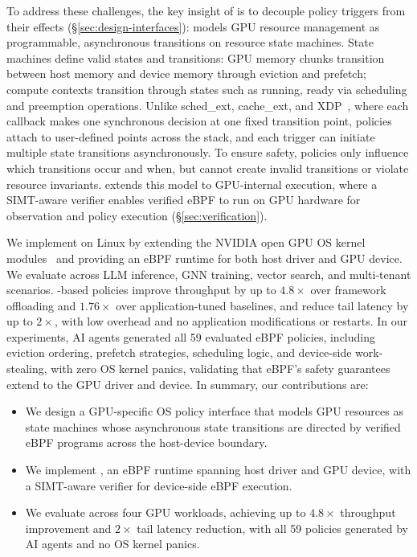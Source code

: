 To address these challenges, the key insight of \sys{} is to decouple policy triggers from their effects (\S\ref{sec:design-interfaces}): \sys{} models GPU resource management as programmable, asynchronous transitions on resource state machines. State machines define valid states and transitions: GPU memory chunks transition between host memory and device memory through eviction and prefetch; compute contexts transition through states such as running, ready via scheduling and preemption operations.
Unlike sched\_ext\cite{schedext-docs}, cache\_ext\cite{zussman2025cache_ext}, and XDP~\cite{bachl2021flow}, where each callback makes one synchronous decision at one fixed transition point, \sys{} policies attach to user-defined points across the stack, and each trigger can initiate multiple state transitions asynchronously. To ensure safety, policies only influence which transitions occur and when, but cannot create invalid transitions or violate resource invariants. \sys{} extends this model to GPU-internal execution, where a SIMT-aware verifier enables verified eBPF to run on GPU hardware for observation and policy execution (\S\ref{sec:verification}).

We implement \sys{} on Linux by extending the NVIDIA open GPU OS kernel modules~\cite{nvidia-open-gpu} and providing an eBPF runtime for both host driver and GPU device. We evaluate \sys{} across LLM inference, GNN training, vector search, and multi-tenant scenarios. \sys-based policies improve throughput by up to $4.8\times$ over framework offloading and $1.76\times$ over application-tuned baselines, and reduce tail latency by up to $2\times$, with low overhead and no application modifications or restarts.
In our experiments, AI agents generated all 59 evaluated eBPF policies, including eviction ordering, prefetch strategies, scheduling logic, and device-side work-stealing, with zero OS kernel panics, validating that eBPF's safety guarantees extend to the GPU driver and device. In summary, our contributions are:

\begin{itemize}[leftmargin=*,itemsep=0pt]
  \item We design a GPU-specific OS policy interface that models GPU resources as state machines whose asynchronous state transitions are directed by verified eBPF programs across the host-device boundary.
  \item We implement \sys, an eBPF runtime spanning host driver and GPU device, with a SIMT-aware verifier for device-side eBPF execution.
  \item We evaluate across four GPU workloads, achieving up to $4.8\times$ throughput improvement and $2\times$ tail latency reduction, with all 59 policies generated by AI agents and no OS kernel panics.
\end{itemize}
